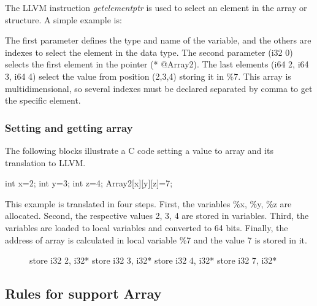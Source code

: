 The LLVM instruction \textit{getelementptr} is used to select an element in
the array or structure. A simple example is: 

\begin{llvmcode}
\end{llvmcode}


The first parameter defines the type and name of the variable, and the others are
indexes to select the element in the data type. The second parameter (i32 0)
selects the first element in the pointer (* @Array2). The last elements 
(i64 2, i64 3, i64 4) select the value from position (2,3,4) storing it in \%7.
This array is multidimensional, so several indexes must be declared separated
by comma to get the specific element.

\subsubsection{Setting and getting array}

The following blocks illustrate a C code setting a value to array
and its translation to LLVM. 

\begin{ccode} 
int x=2; int y=3; int z=4;
Array2[x][y][z]=7;
\end{ccode}

This example is translated in four steps. First, the variables \%x, \%y, \%z 
are allocated. Second, the respective values 2, 3, 4 are stored in variables. 
Third, the variables are loaded to local variables and converted to 64 bits. 
Finally, the address of array is calculated in local variable \%7 and the value 
7 is stored in it.  
\begin{figure}[h]
\begin{llvmcode}
store i32 2, i32* %
store i32 3, i32* %
store i32 4, i32* %
store i32 7, i32* %
\end{llvmcode}
\end{figure}

\subsection{Rules for support Array}


